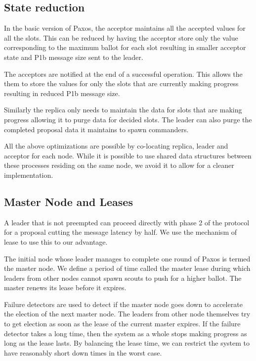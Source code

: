 \subsection{State reduction}

In the basic version of Paxos, the acceptor maintains all the accepted values
for all the slots. This can be reduced by having the acceptor store only the
value corresponding to the maximum ballot for each slot resulting in smaller
acceptor state and P1b message size sent to the leader.

The acceptors are notified at the end of a successful operation. This allows
the them to store the values for only the slots that are currently making
progress resulting in reduced P1b message size.

Similarly the replica only needs to maintain the data for slots that are
making progress allowing it to purge data for decided slots. The leader can
also purge the completed proposal data it maintains to spawn commanders.

All the above optimizations are possible by co-locating replica, leader
and acceptor for each node. While it is possible to use shared data structures
between these processes residing on the same node, we avoid it to allow for
a cleaner implementation.

\subsection{Master Node and Leases}
\label{section:a.n.d.lease}

A leader that is not preempted can proceed directly with phase 2 of the
protocol for a proposal cutting the message latency by half. We use the
mechanism of lease to use this to our advantage.

The initial node whose leader manages to complete one round of Paxos is
termed the master node. We define a period of time called the master lease
during which leaders from other nodes cannot spawn scouts to push for a
higher ballot. The master renews its lease before it expires.

Failure detectors%
are used to detect if the master node goes down to accelerate the election
of the next master node. The leaders from other node themselves try to
get election as soon as the lease of the current master expires. If the
failure detector takes a long time, then the system as a whole
stops making progress as long as the lease lasts. By balancing the lease
time, we can restrict the system to have reasonably short down times in
the worst case.

